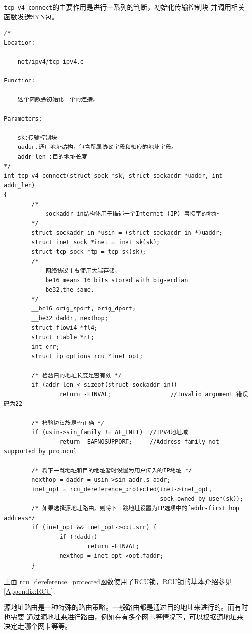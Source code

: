             \texttt{tcp_v4_connect}的主要作用是进行一系列的判断，初始化传输控制块
            并调用相关函数发送SYN包。
\begin{verbatim}
/*
Location:

    net/ipv4/tcp_ipv4.c

Function:

    这个函数会初始化一个的连接。

Parameters:

    sk:传输控制块
    uaddr:通用地址结构，包含所属协议字段和相应的地址字段。
    addr_len :目的地址长度
*/
int tcp_v4_connect(struct sock *sk, struct sockaddr *uaddr, int addr_len)
{
        /*
            sockaddr_in结构体用于描述一个Internet (IP) 套接字的地址     
        */
        struct sockaddr_in *usin = (struct sockaddr_in *)uaddr; 
        struct inet_sock *inet = inet_sk(sk);
        struct tcp_sock *tp = tcp_sk(sk);
		/*
			网络协议主要使用大端存储，
			be16 means 16 bits stored with big-endian
			be32,the same.
		*/
        __be16 orig_sport, orig_dport;
        __be32 daddr, nexthop;                  
        struct flowi4 *fl4;
        struct rtable *rt;
        int err;
        struct ip_options_rcu *inet_opt;

        /* 检验目的地址长度是否有效 */
        if (addr_len < sizeof(struct sockaddr_in))
                return -EINVAL;                 //Invalid argument 错误码为22

        /* 检验协议族是否正确 */
        if (usin->sin_family != AF_INET)  //IPV4地址域
                return -EAFNOSUPPORT;     //Address family not supported by protocol

        /* 将下一跳地址和目的地址暂时设置为用户传入的IP地址 */
        nexthop = daddr = usin->sin_addr.s_addr;
        inet_opt = rcu_dereference_protected(inet->inet_opt,
                                             sock_owned_by_user(sk));
        /* 如果选择源地址路由，则将下一跳地址设置为IP选项中的faddr-first hop address*/
        if (inet_opt && inet_opt->opt.srr) {
                if (!daddr)
                        return -EINVAL;
                nexthop = inet_opt->opt.faddr;
        }
\end{verbatim}

			上面	rcu\_dereference\_protected函数使用了RCU锁，RCU锁的基本介绍参见\ref{Appendix:RCU}.

            源地址路由是一种特殊的路由策略。一般路由都是通过目的地址来进行的。而有时也需要
            通过源地址来进行路由，例如在有多个网卡等情况下，可以根据源地址来决定走哪个网卡等等。

